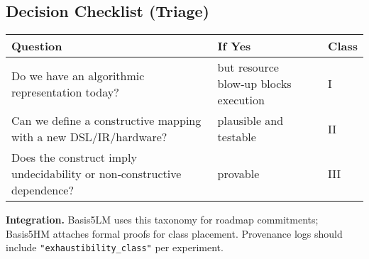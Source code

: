 \subsection{Decision Checklist (Triage)}
\begin{center}
\begin{tabular}{|p{6.5cm}|p{4.0cm}|p{1.2cm}|}
\hline
\textbf{Question} & \textbf{If Yes} & \textbf{Class} \\ \hline
Do we have an algorithmic representation today? & but resource blow‑up blocks execution & I \\ \hline
Can we define a constructive mapping with a new DSL/IR/hardware? & plausible and testable & II \\ \hline
Does the construct imply undecidability or non‑constructive dependence? & provable & III \\ \hline
\end{tabular}
\end{center}

\noindent \textbf{Integration.} Basis5LM uses this taxonomy for roadmap commitments; Basis5HM attaches formal proofs for class placement. Provenance logs should include \verb|"exhaustibility_class"| per experiment.
